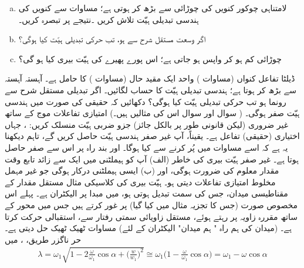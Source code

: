 \begin{enumerate}[a.]
\item
لامتناہی چوکور کنویں کی چوڑائی   سے بڑھ  کر  ہوتی ہے؛  مساوات  سے کنویں کی   ہندسی تبدیلی ہیّت تلاش کریں ۔نتیجے پر تبصرہ کریں۔
\item
اگر وسعت مستقل شرح  سے  ہو،  تب حرکی تبدیلی ہیّت کیا ہوگی؟ 
\item
چوڑائی کم ہو کر  واپس  ہو جاتی ہے؛  اس پورے پھیرے کی ہیّت بیری کیا ہو گی؟ 
\end{enumerate}
ڈیلٹا تفاعل کنواں  (مساوات  )   واحد ایک مقید حال  (مساوات  )  کا حامل ہے۔   آہستہ آہستہ  سے بڑھ کر  ہوتا ہے؛ ہندسی تبدیلی ہیّت کا حساب لگائیں۔ اگر تبدیلی  مستقل شرح  سے رونما ہو تب حرکی تبدیلی ہیّت کیا ہوگی؟
دکھائیں کہ  حقیقی  کی صورت میں ہندسی ہیّت صفر ہوگی۔  ( سوال    اور سوال   اس کی مثالیں ہیں۔) امتیازی تفاعلات موج  کے ساتھ  غیر ضروری  (لیکن قانونی  طور پر بالکل جائز)  جزو ضربی ہیّت منسلک کریں: ،  جہاں   اختیاری  (حقیقی)  تفاعل ہے۔  یقیناً،  آپ غیر صفر ہندسی ہیّت حاصل کریں گے،  تاہم  دیکھنا یہ ہے کہ اسے مساوات    میں  پُر  کرنے سے کیا ہوگا۔ اور بند راہ پر اس سے  صفر حاصل ہوتا ہے۔   غیر صفر ہیّت بیری کی خاطر  (الف)  آپ کو  ہیملٹنی میں ایک سے زائد  تابع وقت مقدار معلوم کی ضرورت ہوگی،  اور (ب)    ایسی ہیملٹنی درکار ہوگی جو غیر  مہمل   مخلوط امتیازی تفاعلات دیتی  ہو۔ 
ہیّت بیری کی کلاسیکی مثال  مستقل مقدار کے  مقناطیسی میدان،  جس کی سمت تبدیل ہوتی ہو،  میں مبدا پر  الیکٹران ہے۔  پہلے اس مخصوص صورت (جس کا تجزیہ مثال     میں کیا گیا)   پر غور کرتے  ہیں   جس میں محور  کے ساتھ   مقررہ  زاویہ   پر رہتے ہوئے،   مستقل زاویائی  سمتی رفتار  سے،      استقبالی حرکت کرتا ہے۔ (میدان   کی ہم راہ "  ہم میدان"  الیکٹران کے لئے)  مساوات  ٹھیک ٹھیک حل دیتی ہے۔ حر ناگزر  طریق،  ،  میں 
\begin{align}
\lambda = \omega_1 \sqrt{1 - 2 \frac{\omega}{\omega_1} \cos \alpha + \big ( \frac{w}{w_1} \big )^2 } \cong \omega_1 \big ( 1 - \frac{\omega}{\omega_1} \cos \alpha \big ) = \omega_1 - \omega \cos \alpha
\end{align}
